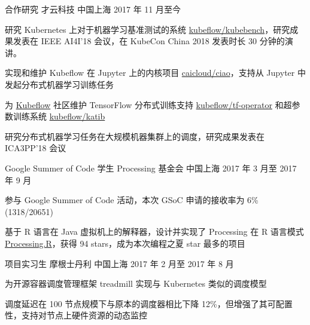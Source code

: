 

\begin{cventries}

  \cventry
    {合作研究} %
    {才云科技} %
    {中国上海} %
    {2017 年 11 月至今} %
    {
      \begin{cvitems} %
        \item 研究 Kubernetes 上对于机器学习基准测试的系统 \href{https://github.com/kubeflow/kubebench}{kubeflow/kubebench}，研究成果发表在 IEEE AI4I'18 会议，在 KubeCon China 2018 发表时长 30 分钟的演讲。
        \item 实现和维护 Kubeflow 在 Jupyter 上的内核项目 \href{https://github.com/caicloud/ciao}{caicloud/ciao}，支持从 Jupyter 中发起分布式机器学习训练任务
        \item 为 \href{https://github.com/kubeflow/kubeflow}{Kubeflow} 社区维护 TensorFlow 分布式训练支持 \href{https://github.com/kubeflow/tf-operator}{kubeflow/tf-operator} 和超参数训练系统 \href{https://github.com/kubeflow/katib}{kubeflow/katib}
        \item 研究分布式机器学习任务在大规模机器集群上的调度，研究成果发表在 ICA3PP'18 会议
      \end{cvitems}
    }

  \cventry
    {Google Summer of Code 学生} %
    {Processing 基金会} %
    {中国上海} %
    {2017 年 3 月至 2017 年 9 月} %
    {
      \begin{cvitems} %
        \item 参与 Google Summer of Code 活动，本次 GSoC 申请的接收率为 6\%(1318/20651)
        \item 基于 R 语言在 Java 虚拟机上的解释器，设计并实现了 Processing 在 R 语言模式 \href{https://github.com/gaocegege/Processing.R}{Processing.R}，获得 94 stars，成为本次编程之夏 star 最多的项目
      \end{cvitems}
    }

  \cventry
    {项目实习生} %
    {摩根士丹利} %
    {中国上海} %
    {2017 年 2 月至 2017 年 8 月} %
    {
      \begin{cvitems} %
        \item 为开源容器调度管理框架 treadmill 实现与 Kubernetes 类似的调度模型
        \item 调度延迟在 100 节点规模下与原本的调度器相比下降 12\%，但增强了其可配置性，支持对节点上硬件资源的动态监控
      \end{cvitems}
    }


\end{cventries}
